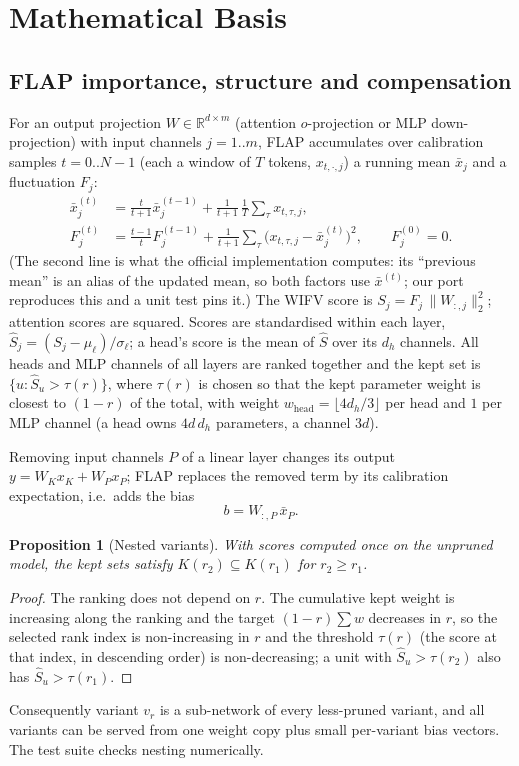 \documentclass[11pt,a4paper]{article}
\newtheorem{proposition}{Proposition}
\begin{document}
\section{Mathematical Basis}
\label{sec:math}
\subsection{FLAP importance, structure and compensation}
For an output projection $W\in\mathbb R^{d\times m}$ (attention $o$-projection or MLP down-projection)
with input channels $j=1..m$, FLAP accumulates over calibration samples $t=0..N-1$ (each a window of
$T$ tokens, $x_{t,\cdot,j}$) a running mean $\bar x_j$ and a fluctuation $F_j$:
\begin{align}
  \bar x^{(t)}_j &= \tfrac{t}{t+1}\bar x^{(t-1)}_j+\tfrac{1}{t+1}\,\tfrac1T\textstyle\sum_{\tau}x_{t,\tau,j},\\
  F^{(t)}_j &= \tfrac{t-1}{t}F^{(t-1)}_j+\tfrac1{t+1}\textstyle\sum_\tau\big(x_{t,\tau,j}-\bar x^{(t)}_j\big)^2,\qquad F^{(0)}_j=0 .
\end{align}
(The second line is what the official implementation computes: its ``previous mean'' is an alias of the
updated mean, so both factors use $\bar x^{(t)}$; our port reproduces this and a unit test pins it.)
The WIFV score is $S_j=F_j\,\lVert W_{:,j}\rVert_2^2$; attention scores are squared. Scores are standardised
within each layer, $\hat S_j=(S_j-\mu_\ell)/\sigma_\ell$; a head's score is the mean of $\hat S$ over its
$d_h$ channels. All heads and MLP channels of all layers are ranked together and the kept set is
$\{u:\hat S_u>\tau(r)\}$, where $\tau(r)$ is chosen so that the kept parameter weight is closest to $(1-r)$ of
the total, with weight $w_{\text{head}}=\lfloor 4d_h/3\rfloor$ per head and $1$ per MLP channel (a head owns
$4d\,d_h$ parameters, a channel $3d$).

Removing input channels $P$ of a linear layer changes its output $y=W_Kx_K+W_Px_P$; FLAP replaces the
removed term by its calibration expectation, i.e.\ adds the bias
\begin{equation}
  b=W_{:,P}\,\bar x_P .
\end{equation}

\begin{proposition}[Nested variants]\label{prop:nested}
With scores computed once on the unpruned model, the kept sets satisfy $K(r_2)\subseteq K(r_1)$ for
$r_2\ge r_1$.
\end{proposition}
\begin{proof}
The ranking does not depend on $r$. The cumulative kept weight is increasing along the ranking and the
target $(1-r)\sum w$ decreases in $r$, so the selected rank index is non-increasing in $r$ and the
threshold $\tau(r)$ (the score at that index, in descending order) is non-decreasing; a unit with
$\hat S_u>\tau(r_2)$ also has $\hat S_u>\tau(r_1)$.
\end{proof}
Consequently variant $v_r$ is a sub-network of every less-pruned variant, and all variants can be served
from one weight copy plus small per-variant bias vectors. The test suite checks nesting numerically.
\end{document}
